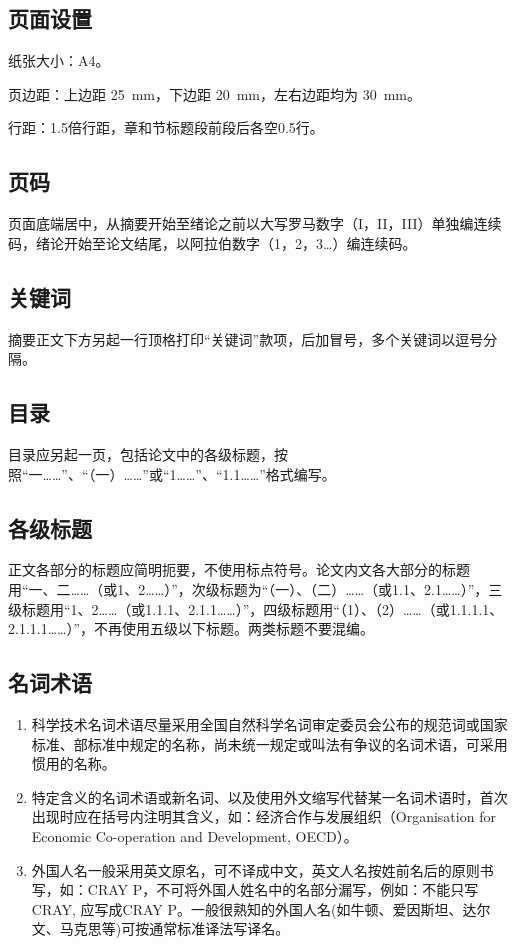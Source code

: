 \subsection{页面设置}

纸张大小：A4。

页边距：上边距 \SI{25}{mm}，下边距 \SI{20}{mm}，左右边距均为 \SI{30}{mm}。

行距：1.5倍行距，章和节标题段前段后各空0.5行。

\subsection{页码}

页面底端居中，从摘要开始至绪论之前以大写罗马数字（I，II，III）单独编连续码，绪论开始至论文结尾，以阿拉伯数字（1，2，3…）编连续码。

\subsection{关键词}

摘要正文下方另起一行顶格打印“关键词”款项，后加冒号，多个关键词以逗号分隔。

\subsection{目录}

目录应另起一页，包括论文中的各级标题，按照“一……”、“（一）……”或“1……”、“1.1……”格式编写。

\subsection{各级标题}\label{subsec-titlenumber}

正文各部分的标题应简明扼要，不使用标点符号。论文内文各大部分的标题用“一、二……（或1、2……）”，次级标题为“（一）、（二）……（或1.1、2.1……）”，三级标题用“1、2……（或1.1.1、2.1.1……）”，四级标题用“（1）、（2）……（或1.1.1.1、2.1.1.1……）”，不再使用五级以下标题。两类标题不要混编。

\subsection{名词术语}

\begin{enumerate}
	\item 科学技术名词术语尽量采用全国自然科学名词审定委员会公布的规范词或国家标准、部标准中规定的名称，尚未统一规定或叫法有争议的名词术语，可采用惯用的名称。
	\item 特定含义的名词术语或新名词、以及使用外文缩写代替某一名词术语时，首次出现时应在括号内注明其含义，如：经济合作与发展组织（Organisation for Economic Co-operation and Development, OECD）。
	\item 外国人名一般采用英文原名，可不译成中文，英文人名按姓前名后的原则书写，如：CRAY P，不可将外国人姓名中的名部分漏写，例如：不能只写CRAY, 应写成CRAY P。一般很熟知的外国人名(如牛顿、爱因斯坦、达尔文、马克思等)可按通常标准译法写译名。
\end{enumerate}

